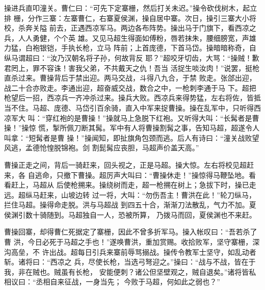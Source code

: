 操进兵直叩潼关。曹仁曰：“可先下定寨栅，然后打关未迟。”操令砍伐树木，起立排
栅，分作三寨：左寨曹仁，右寨夏侯渊，操自居中寨。次日，操引三寨大小将校，杀奔关隘
前去，正遇西凉军马。两边各布阵势。操出马于门旗下，看西凉之兵，人人勇健，个个英
雄。又见马超生得面如傅粉，唇若抹朱，腰细膀宽，声雄力猛，白袍银铠，手执长枪，立马
阵前；上首庞德，下首马岱。操暗暗称奇，自纵马谓超曰：“汝乃汉朝名将子孙，何故背反
耶？”超咬牙切齿，大骂：“操贼！歉君罔上，罪不容诛！害我父弟，不共戴天之仇！吾当
活捉生啖汝肉！”说罢，挺枪直杀过来。曹操背后于禁出迎。两马交战，斗得八九合，于禁
败走。张郃出迎，战二十合亦败走。李通出迎，超奋威交战，数合之中，一枪刺李通于马
下。超把枪望后一招，西凉兵一齐冲杀过来。操兵大败。西凉兵来得势猛，左右将佐，皆抵
当不住。马超、庞德、马岱引百余骑，直入中军来捉曹操。操在乱军中，只听得西凉军大
叫：“穿红袍的是曹操！”操就马上急脱下红袍。又听得大叫：“长髯者是曹操！”操惊
慌，掣所佩刀断其髯。军中有人将曹操割髯之事，告知马超，超遂令人叫拿：“短髯者是曹
操！”操闻知，即扯旗角包颈而逃。后人有诗曰：“潼关战败望风逃，孟德怆惶脱锦袍。剑
割髭髯应丧胆，马超声价盖天高。”

曹操正走之间，背后一骑赶来，回头视之，正是马超。操大惊。左右将校见超赶来，各
自逃命，只撤下曹操。超厉声大叫曰：“曹操休走！”操惊得马鞭坠地。看看赶上，马超从
后使枪搠来。操绕树而走，超一枪搠在树上；急拔下时，操已走远。超纵马赶来，山坡边转
过一将，大叫：“勿伤吾主！曹洪在此！”轮刀纵马，拦住马超。操得命走脱。洪与马超战
到四五十合，渐渐刀法散乱，气力不加。夏侯渊引数十骑随到。马超独自一人，恐被所算，
乃拨马而回，夏侯渊也不来赶。

曹操回寨，却得曹仁死据定了寨栅，因此不曾多折军马。操入帐叹曰：“吾若杀了曹
洪，今日必死于马超之手也！”遂唤曹洪，重加赏赐。收拾败军，坚守寨栅，深沟高垒，不
许出战。超每日引兵来寨前辱骂搦战。操传令教军士坚守，如乱动者斩。诸将曰：“西凉之
兵，尽使长枪，当选弓弩迎之。”操曰：“战与不战，皆在于我，非在贼也。贼虽有长枪，
安能便刺？诸公但坚壁观之，贼自退矣。”诸将皆私相议曰：“丞相自来征战，一身当先；
今败于马超，何如此之弱也？”

